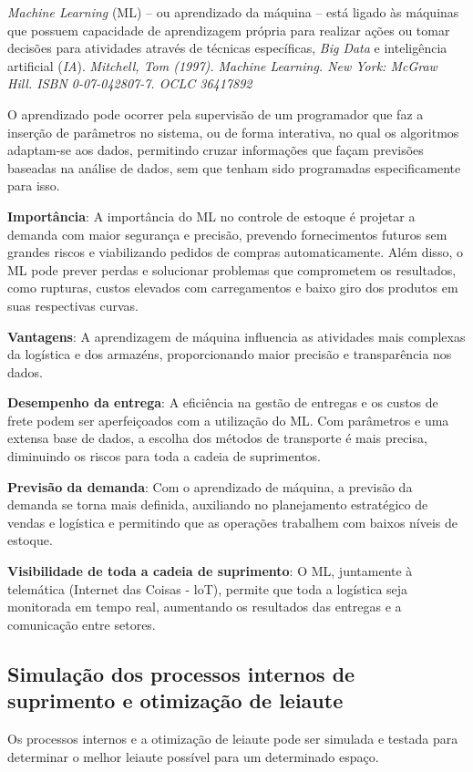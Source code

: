\documentclass{article}
\begin{document}
{\it Machine Learning} (ML) – ou aprendizado da máquina – está ligado às máquinas que possuem capacidade de aprendizagem própria para realizar ações ou tomar decisões para atividades através de técnicas específicas, {\it Big Data} e inteligência artificial ({\it IA}). {\it Mitchell, Tom (1997). Machine Learning. New York: McGraw Hill. ISBN 0-07-042807-7. OCLC 36417892}  

O aprendizado pode ocorrer pela supervisão de um programador que faz a inserção de parâmetros no sistema, ou de forma interativa, no qual os algoritmos adaptam-se aos dados, permitindo cruzar informações que façam previsões baseadas na análise de dados, sem que tenham sido programadas especificamente para isso.

{\bf Importância}: A importância do ML no controle de estoque é projetar a demanda com maior segurança e precisão, prevendo fornecimentos futuros sem grandes riscos e viabilizando pedidos de compras automaticamente. Além disso, o ML pode prever perdas e solucionar problemas que comprometem os resultados, como rupturas, custos elevados com carregamentos e baixo giro dos produtos em suas respectivas curvas.

{\bf Vantagens}: A aprendizagem de máquina influencia as atividades mais complexas da logística e dos armazéns, proporcionando maior precisão e transparência nos dados.

{\bf Desempenho da entrega}: A eficiência na gestão de entregas e os custos de frete podem ser aperfeiçoados com a utilização do ML. Com parâmetros e uma extensa base de dados, a escolha dos métodos de transporte é mais precisa, diminuindo os riscos para toda a cadeia de suprimentos.

{\bf Previsão da demanda}: Com o aprendizado de máquina, a previsão da demanda se torna mais definida, auxiliando no planejamento estratégico de vendas e logística e permitindo que as operações trabalhem com baixos níveis de estoque.

{\bf Visibilidade de toda a cadeia de suprimento}: O ML, juntamente à telemática (Internet das Coisas - loT), permite que toda a logística seja monitorada em tempo real, aumentando os resultados das entregas e a comunicação entre setores.

\subsection{Simulação dos processos internos de suprimento e otimização de leiaute}

Os processos internos e a otimização de leiaute pode ser simulada e testada para determinar o melhor leiaute possível para um determinado espaço.
\end{document}
